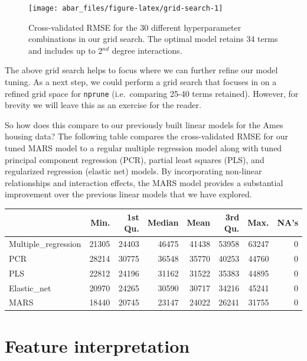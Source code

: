 \documentclass[]{book}
\theoremstyle{definition}
\theoremstyle{definition}
\theoremstyle{definition}
\theoremstyle{remark}
\begin{document}
\begin{figure}

{\centering \texttt{[image: abar\_files/figure-latex/grid-search-1]} 

}

\caption{Cross-validated RMSE for the 30 different hyperparameter combinations in our grid search. The optimal model retains 34 terms and includes up to 2$^{nd}$ degree interactions.}\label{fig:grid-search}
\end{figure}

The above grid search helps to focus where we can further refine our
model tuning. As a next step, we could perform a grid search that
focuses in on a refined grid space for \texttt{nprune} (i.e.~comparing
25-40 terms retained). However, for brevity we will leave this as an
exercise for the reader.

So how does this compare to our previously built linear models for the
Ames housing data? The following table compares the cross-validated RMSE
for our tuned MARS model to a regular multiple regression model along
with tuned principal component regression (PCR), partial least squares
(PLS), and regularized regression (elastic net) models. By incorporating
non-linear relationships and interaction effects, the MARS model
provides a substantial improvement over the previous linear models that
we have explored.

\begin{table}[H]
\centering
\begin{tabular}{l|r|r|r|r|r|r|r}
\hline
  & Min. & 1st Qu. & Median & Mean & 3rd Qu. & Max. & NA's\\
\hline
Multiple\_regression & 21305 & 24403 & 46475 & 41438 & 53958 & 63247 & 0\\
\hline
PCR & 28214 & 30775 & 36548 & 35770 & 40253 & 44760 & 0\\
\hline
PLS & 22812 & 24196 & 31162 & 31522 & 35383 & 44895 & 0\\
\hline
Elastic\_net & 20970 & 24265 & 30590 & 30717 & 34216 & 45241 & 0\\
\hline
MARS & 18440 & 20745 & 23147 & 24022 & 26241 & 31755 & 0\\
\hline
\end{tabular}
\end{table}

\hypertarget{feature-interpretation-1}{%
\section{Feature interpretation}\label{feature-interpretation-1}}
\end{document}
